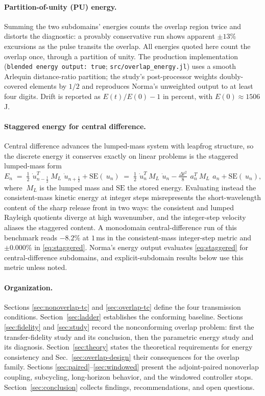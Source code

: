 \documentclass[11pt]{article}
\newcommand{\code}[1]{\texttt{#1}}
\begin{document}
\paragraph{Partition-of-unity (PU) energy.} Summing the two subdomains'
energies counts the overlap region twice and distorts the diagnostic: a
provably conservative run shows apparent $\pm 13\%$ excursions as the pulse
transits the overlap. All energies quoted here count the overlap once,
through a partition of unity. The production implementation
(\code{blended energy output: true}; \code{src/overlap\_energy.jl}) uses a
smooth Arlequin distance-ratio partition; the study's post-processor weights
doubly-covered elements by $1/2$ and reproduces Norma's unweighted output to
at least four digits. Drift is reported as $E(t)/E(0) - 1$ in percent, with
$E(0) \approx 1506$\,J.

\paragraph{Staggered energy for central difference.} Central difference
advances the lumped-mass system with leapfrog structure, so the discrete
energy it conserves exactly on linear problems is the staggered lumped-mass
form
\begin{equation}
  E_n \;=\; \tfrac12\,\dot{~u}_{n-\frac12}^{T} ~M_L\, \dot{~u}_{n+\frac12}
        + \mathrm{SE}(~u_n)
      \;=\; \tfrac12\,\dot{~u}_n^{T} ~M_L\, \dot{~u}_n
        - \tfrac{\Delta t^2}{8}\, ~a_n^{T} ~M_L\, ~a_n
        + \mathrm{SE}(~u_n),
  \label{eq:staggered}
\end{equation}
where $~M_L$ is the lumped mass and $\mathrm{SE}$ the stored energy.
Evaluating instead the consistent-mass kinetic energy at integer steps
misrepresents the short-wavelength content of the sharp release front in two
ways: the consistent and lumped Rayleigh quotients diverge at high
wavenumber, and the integer-step velocity aliases the staggered content. A
monodomain central-difference run of this benchmark reads $-8.2\%$ at
$1$\,ms in the consistent-mass integer-step metric and $\pm 0.000\%$ in
\eqref{eq:staggered}. Norma's energy output evaluates \eqref{eq:staggered}
for central-difference subdomains, and explicit-subdomain results below use
this metric unless noted.

\paragraph{Organization.} Sections \ref{sec:nonoverlap-tc} and
\ref{sec:overlap-tc} define the four transmission conditions.
Section~\ref{sec:ladder} establishes the conforming baseline. Sections
\ref{sec:fidelity} and \ref{sec:study} record the nonconforming overlap
problem: first the transfer-fidelity study and its conclusion, then the
parametric energy study and its diagnosis. Section~\ref{sec:theory} states
the theoretical requirements for energy consistency and
Sec.~\ref{sec:overlap-design} their consequences for the overlap family.
Sections \ref{sec:paired}--\ref{sec:windowed} present the adjoint-paired
nonoverlap coupling, subcycling, long-horizon behavior, and the windowed
controller stops. Section~\ref{sec:conclusion} collects findings,
recommendations, and open questions.
\end{document}
